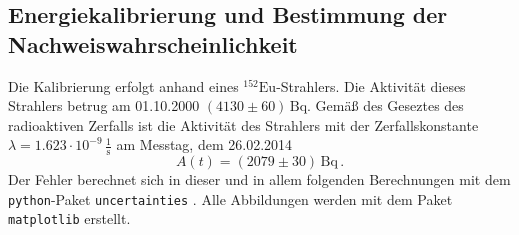 \subsection{Energiekalibrierung und Bestimmung der Nachweiswahrscheinlichkeit}
\label{sec:nachweis}
Die Kalibrierung erfolgt anhand eines $^{152}\text{Eu}$-Strahlers.  
Die Aktivität dieses Strahlers betrug am 01.10.2000 $(4130 \pm 60) \, \text{Bq}$. Gemäß des Geseztes des
radioaktiven Zerfalls ist die Aktivität des Strahlers mit der Zerfallskonstante 
$\lambda = 1.623 \cdot 10^{-9} \, \frac{1}{\text{s}}$ \cite{Periodensystem}
am Messtag, dem 26.02.2014
\begin{equation*}
    A(t) = (2079 \pm 30) \, \text{Bq} \, .
\end{equation*}
Der Fehler berechnet sich in dieser und in allem folgenden Berechnungen mit dem 
\texttt{python}-Paket \texttt{uncertainties} \cite{uncertainties}. Alle Abbildungen werden mit dem Paket \texttt{matplotlib}
\cite{Hunter:2007} erstellt.

